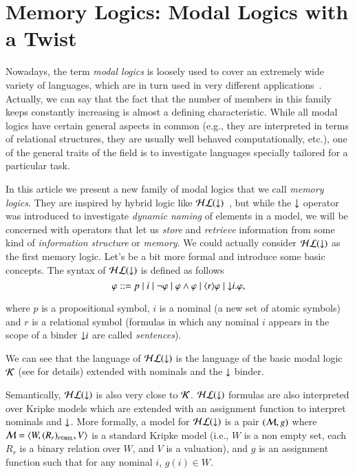 \section{Memory Logics: Modal Logics with a Twist}\label{twist}

Nowadays, the term \emph{modal logics} is loosely used to cover
an extremely wide variety of languages, which are in turn used
in very different applications~\cite{BRV01,blac:hand06}.  Actually,
we can say that the fact
that the number of members in this family keeps constantly increasing
is almost a defining characteristic.  While all modal logics have
certain general aspects in common (e.g., they are interpreted in
terms of relational structures, they are usually well behaved
computationally, etc.), one of the general traits of the field is
to investigate languages specially tailored for a particular task.

In this article we present a new family of modal logics that
we call \emph{memory logics}. They
are inspired by hybrid logic like $\mathcal{HL}({\downarrow})$~\cite{arec:hybr05b}, but while the
${\downarrow}$ operator was introduced to investigate \emph{dynamic naming}
of elements in a model, we will be concerned with operators that
let us \emph{store} and \emph{retrieve} information from some kind
of \emph{information structure} or \emph{memory}.
We could actually consider $\mathcal{HL}({\downarrow})$ as the first memory logic.
Let's be a bit more formal and introduce some basic concepts.
The syntax of $\mathcal{HL}({\downarrow})$ is defined as follows
$$
\varphi ::= p \mid i \mid \lnot \varphi \mid \varphi \land
\varphi \mid \langle r \rangle \varphi \mid {\downarrow} i. \varphi,
$$

\noindent
where $p$ is a propositional symbol, $i$ is a nominal (a new set of
atomic symbols) and  $r$ is a relational symbol (formulas in which any nominal $i$
appears in the scope of a binder ${\downarrow} i$ are called \emph{sentences}).

We can see that the language of $\mathcal{HL}({\downarrow})$ is the language of the basic
modal logic $\mathcal{K}$ (see \cite{BRV01} for details) extended with nominals
and the ${\downarrow}$ binder.

Semantically, $\mathcal{HL}({\downarrow})$ is also very close to $\mathcal{K}$.  $\mathcal{HL}({\downarrow})$
formulas are also interpreted over Kripke models which are extended with an
assignment function to interpret nominals and ${\downarrow}$. More formally,
a model for $\mathcal{HL}({\downarrow})$ is a pair $(\mathcal{M},g)$ where $\mathcal{M}=\langle W,(R_r)_{r \in \textsc{rel}},V \rangle$ is a standard Kripke model (i.e., $W$ is a non empty set, each $R_r$ is a binary relation
over $W$, and $V$ is a valuation), and $g$ is an assignment function
such that for any nominal $i$, $g(i) \in W$.

